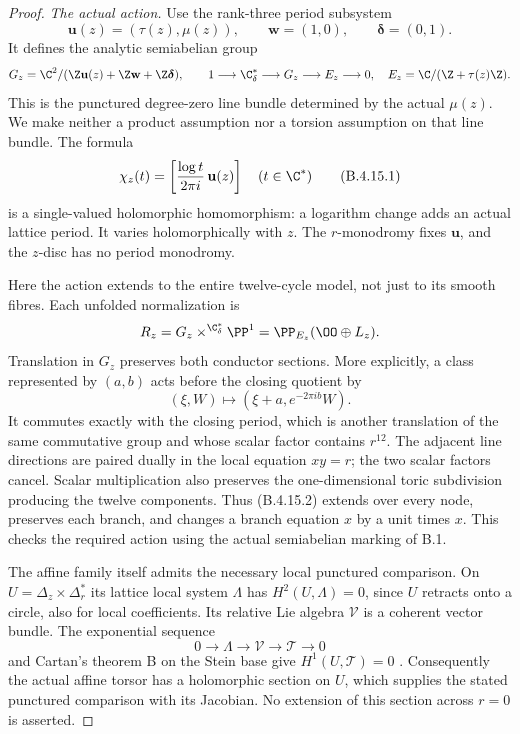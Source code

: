 \begin{proof}
\emph{The actual action.}
Use the rank-three period subsystem
\[
 \mathbf u(z)=(\tau(z),\mu(z)),\qquad
 \mathbf w=(1,0),\qquad \boldsymbol\delta=(0,1).
\]
It defines the analytic semiabelian group
\[
 G_z=\C^2/(\Z\mathbf u(z)+\Z\mathbf w+
                    \Z\boldsymbol\delta),
 \qquad
 1\longrightarrow\C^*_{\delta}\longrightarrow G_z
       \longrightarrow E_z\longrightarrow0,
 \quad E_z=\C/(\Z+\tau(z)\Z).
\]
This is the punctured degree-zero line bundle determined
by the actual $\mu(z)$. We make neither a product assumption
nor a torsion assumption on that line bundle. The formula
\[
 \chi_z(t)=
 \left[\frac{\log t}{2\pi i}\,\mathbf u(z)\right]
 \quad(t\in\C^*)
 \tag{B.4.15.1}
\]
is a single-valued holomorphic homomorphism: a logarithm
change adds an actual lattice period. It varies
holomorphically with $z$. The $r$-monodromy fixes
$\mathbf u$, and the $z$-disc has no period monodromy.

Here the action extends to the entire twelve-cycle model,
not just to its smooth fibres. Each unfolded normalization
is
\[
 R_z=G_z\mathbin{\times^{\C^*_{\delta}}}\PP^1
       =\PP_{E_z}(\OO\oplus L_z).
\]
Translation in $G_z$ preserves both conductor sections.
More explicitly, a class represented by $(a,b)$ acts
before the closing quotient by
\[
  (\xi,W)\longmapsto
            (\xi+a,e^{-2\pi i b}W).
 \tag{B.4.15.2}
\]
It commutes exactly with the closing period, which is
another translation of the same commutative group and
whose scalar factor contains $r^{12}$. The adjacent line
directions are paired dually in the local equation $xy=r$;
the two scalar factors cancel. Scalar multiplication also
preserves the one-dimensional toric subdivision producing
the twelve components. Thus (B.4.15.2) extends over every
node, preserves each branch, and changes a branch equation
$x$ by a unit times $x$. This checks the required action
using the actual semiabelian marking of B.1.

The affine family itself admits the necessary local
punctured comparison. On
$U=\Delta_z\times\Delta_r^*$ its lattice local system
$\Lambda$ has $H^2(U,\Lambda)=0$, since $U$ retracts onto
a circle, also for local coefficients. Its relative Lie
algebra $\mathcal V$ is a coherent vector bundle. The
exponential sequence
\[
 0\longrightarrow\Lambda\longrightarrow\mathcal V
       \longrightarrow\mathcal T\longrightarrow0
\]
and Cartan's theorem B on the Stein base give
$H^1(U,\mathcal T)=0$ \citep{Cartan1952B_AB}.
Consequently the actual affine torsor has a holomorphic
section on $U$, which supplies the stated punctured
comparison with its Jacobian. No extension of this
section across $r=0$ is asserted.


\end{proof}

